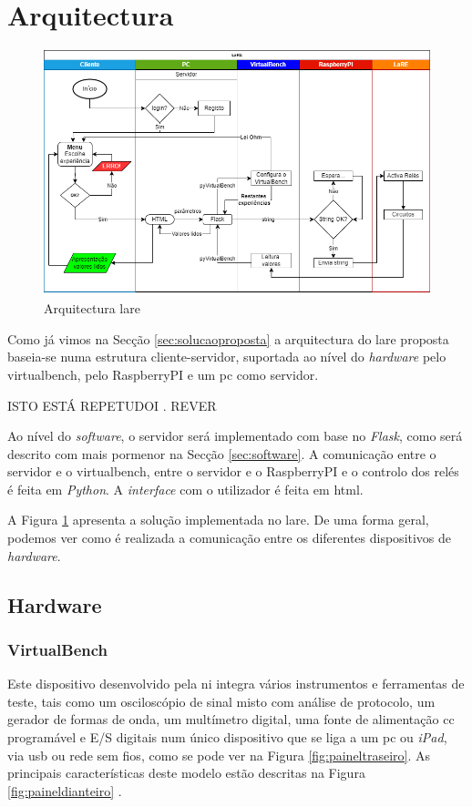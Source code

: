 \section{Arquitectura}
\begin{figure}[hbtp]
    \centering
    \includegraphics[width=1\textwidth]{figures/Diagrama_SOFTWARE.drawio.png}
    \caption{Arquitectura \acrshort{lare}}
    \label{fig:arquitecturalore}
\end{figure}

Como já vimos na Secção \ref{sec:solucaoproposta} a arquitectura do \acrshort{lare} proposta baseia-se numa estrutura cliente-servidor, suportada ao nível do \textit{hardware} pelo \acrshort{virtualbench}, pelo \gls{RaspberryPI} e um \acrshort{pc} como servidor.

ISTO ESTÁ REPETUDOI . REVER

Ao nível do \textit{software}, o servidor será implementado com base no \textit{Flask}, como será descrito com mais pormenor na Secção \ref{sec:software}. A comunicação entre o servidor e o \acrshort{virtualbench}, entre o servidor e o \gls{RaspberryPI} e o controlo dos relés é feita em \textit{Python}. A \textit{interface} com o utilizador é feita em \acrshort{html}.

A Figura {\ref{fig:arquitecturalore}} apresenta a solução implementada no \acrshort{lare}. De uma forma geral, podemos ver como é realizada a comunicação entre os diferentes dispositivos de \textit{hardware}.

\subsection{Hardware}
\label{sec:hardware}
\subsubsection{VirtualBench}
Este dispositivo desenvolvido pela \acrshort{ni} integra vários instrumentos e ferramentas de teste, tais como um osciloscópio de sinal misto com análise de protocolo, um gerador de formas de onda, um multímetro digital, uma fonte de alimentação \acrfull{cc} programável e E/S digitais num único dispositivo que se liga a um \acrshort{pc} ou \textit{iPad}, via \acrshort{usb} ou rede sem fios, como se pode ver na Figura \ref{fig:paineltraseiro}. As principais características deste modelo estão descritas na Figura \ref{fig:paineldianteiro} \cite{datasheetVirtualBench}.

